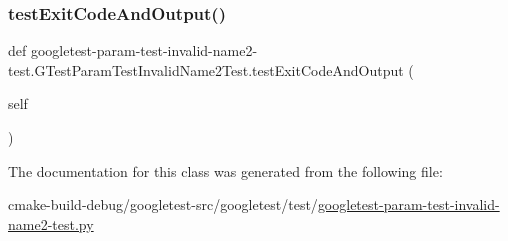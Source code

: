 \subsubsection{\texorpdfstring{testExitCodeAndOutput()}{testExitCodeAndOutput()}}
{\footnotesize\ttfamily def googletest-\/param-\/test-\/invalid-\/name2-\/test.\+G\+Test\+Param\+Test\+Invalid\+Name2\+Test.\+test\+Exit\+Code\+And\+Output (\begin{DoxyParamCaption}\item[{}]{self }\end{DoxyParamCaption})}



The documentation for this class was generated from the following file\+:\begin{DoxyCompactItemize}
\item 
cmake-\/build-\/debug/googletest-\/src/googletest/test/\mbox{\hyperlink{googletest-param-test-invalid-name2-test_8py}{googletest-\/param-\/test-\/invalid-\/name2-\/test.\+py}}\end{DoxyCompactItemize}
